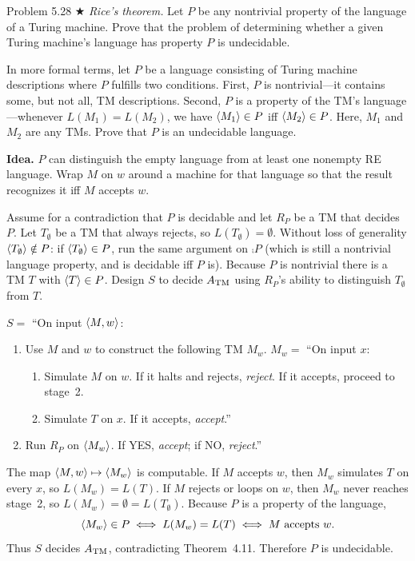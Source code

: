 \begin{question}{Problem 5.28 $\bigstar$}
\emph{Rice's theorem.} Let $P$ be any nontrivial property of the language of a Turing machine. Prove that the problem of determining whether a given Turing machine's language has property $P$ is undecidable.

In more formal terms, let $P$ be a language consisting of Turing machine descriptions where $P$ fulfills two conditions. First, $P$ is nontrivial---it contains some, but not all, TM descriptions. Second, $P$ is a property of the TM's language---whenever $L(M_1)=L(M_2)$, we have $\langle M_1\rangle\in P$ iff $\langle M_2\rangle\in P$. Here, $M_1$ and $M_2$ are any TMs. Prove that $P$ is an undecidable language.
\end{question}
\begin{soln}
\textbf{Idea.} $P$ can distinguish the empty language from at least one nonempty RE language. Wrap $M$ on $w$ around a machine for that language so that the result recognizes it iff $M$ accepts $w$.

Assume for a contradiction that $P$ is decidable and let $R_P$ be a TM that decides $P$. Let $T_\emptyset$ be a TM that always rejects, so $L(T_\emptyset)=\emptyset$. Without loss of generality $\langle T_\emptyset\rangle\notin P$: if $\langle T_\emptyset\rangle\in P$, run the same argument on $\comp{P}$ (which is still a nontrivial language property, and is decidable iff $P$ is). Because $P$ is nontrivial there is a TM $T$ with $\langle T\rangle\in P$. Design $S$ to decide $A_{\mathrm{TM}}$ using $R_P$'s ability to distinguish $T_\emptyset$ from $T$.

$S=$ ``On input $\langle M,w\rangle$:
\begin{enumerate}
\item Use $M$ and $w$ to construct the following TM $M_w$.
$M_w=$ ``On input $x$:
\begin{enumerate}
\item Simulate $M$ on $w$. If it halts and rejects, \emph{reject}. If it accepts, proceed to stage~2.
\item Simulate $T$ on $x$. If it accepts, \emph{accept}.''
\end{enumerate}
\item Run $R_P$ on $\langle M_w\rangle$. If YES, \emph{accept}; if NO, \emph{reject}.''
\end{enumerate}

The map $\langle M,w\rangle\mapsto\langle M_w\rangle$ is computable. If $M$ accepts $w$, then $M_w$ simulates $T$ on every $x$, so $L(M_w)=L(T)$. If $M$ rejects or loops on $w$, then $M_w$ never reaches stage~2, so $L(M_w)=\emptyset=L(T_\emptyset)$. Because $P$ is a property of the language,
\[
\langle M_w\rangle\in P \iff L(M_w)=L(T) \iff M\text{ accepts }w.
\]
Thus $S$ decides $A_{\mathrm{TM}}$, contradicting Theorem~4.11. Therefore $P$ is undecidable.
\end{soln}

